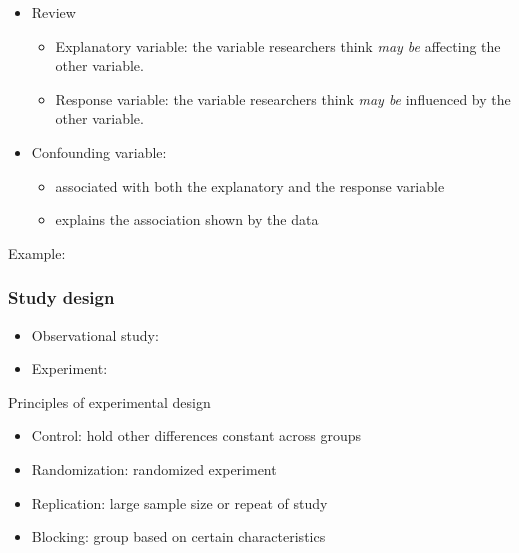 \documentclass[
]{report}
\providecommand{\tightlist}{%
  \setlength{\itemsep}{0pt}\setlength{\parskip}{0pt}}
\begin{document}
\begin{itemize}
\item
  Review

  \begin{itemize}
  \item
    Explanatory variable: the variable researchers think \emph{may be} affecting the other variable.
  \item
    Response variable: the variable researchers think \emph{may be} influenced by the other variable.
  \end{itemize}
\item
  Confounding variable:

  \begin{itemize}
  \tightlist
  \item
    associated with both the explanatory and the response variable
  \item
    explains the association shown by the data
  \end{itemize}
\end{itemize}

Example:

\vspace{0.8in}

\subsubsection*{Study design}\label{study-design}

\begin{itemize}
\tightlist
\item
  Observational study:
\end{itemize}

\vspace{0.5in}

\begin{itemize}
\tightlist
\item
  Experiment:
\end{itemize}

\vspace{0.5in}

Principles of experimental design

\begin{itemize}
\item
  Control: hold other differences constant across groups
  \vspace{1mm}
\item
  Randomization: randomized experiment
  \vspace{1mm}
\item
  Replication: large sample size or repeat of study
  \vspace{1mm}
\item
  Blocking: group based on certain characteristics
  \vspace{1mm}
\end{itemize}
\end{document}
